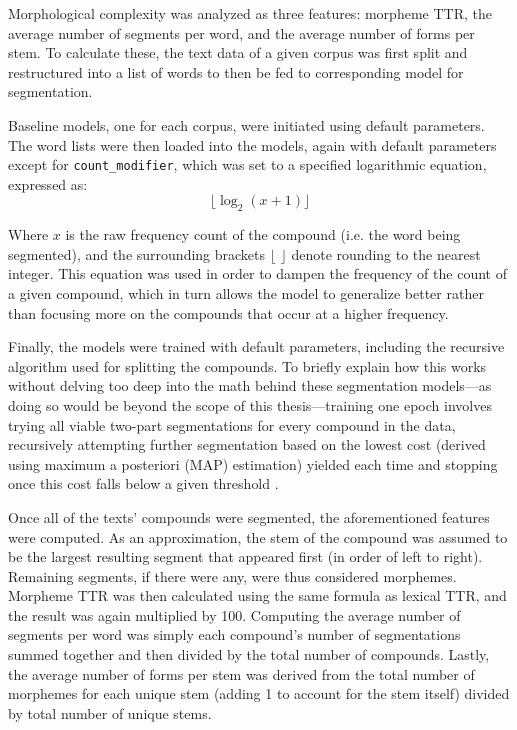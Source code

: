 \documentclass[12pt,a4paper]{article}
\numberwithin{figure}{section}
\numberwithin{table}{section}
\numberwithin{definition}{section}
\begin{document}
Morphological complexity was analyzed as three features: morpheme TTR, the average number of segments per word, and the average number of forms per stem. To calculate these, the text data of a given corpus was first split and restructured into a list of words to then be fed to corresponding model for segmentation.

Baseline models, one for each corpus, were initiated using default parameters. The word lists were then loaded into the models, again with default parameters except for \texttt{count\_modifier}, which was set to a specified logarithmic equation, expressed as: \[\lfloor\log_2(x + 1)\rfloor\]

Where \( x \) is the raw frequency count of the compound (i.e. the word being segmented), and the surrounding brackets \( \lfloor \) \( \rfloor \) denote rounding to the nearest integer. This equation was used in order to dampen the frequency of the count of a given compound, which in turn allows the model to generalize better rather than focusing more on the compounds that occur at a higher frequency.

Finally, the models were trained with default parameters, including the recursive algorithm used for splitting the compounds. To briefly explain how this works without delving too deep into the math behind these segmentation models---as doing so would be beyond the scope of this thesis---training one epoch involves trying all viable two-part segmentations for every compound in the data, recursively attempting further segmentation based on the lowest cost (derived using maximum a posteriori (MAP) estimation) yielded each time and stopping once this cost falls below a given threshold \parencite{Smit2014inproceedings}. 




Once all of the texts' compounds were segmented, the aforementioned features were computed. As an approximation, the stem of the compound was assumed to be the largest resulting segment that appeared first (in order of left to right). Remaining segments, if there were any, were thus considered morphemes. Morpheme TTR was then calculated using the same formula as lexical TTR, and the result was again multiplied by 100. Computing the average number of segments per word was simply each compound's number of segmentations summed together and then divided by the total number of compounds. Lastly, the average number of forms per stem was derived from the total number of morphemes for each unique stem (adding 1 to account for the stem itself) divided by total number of unique stems.
\end{document}
